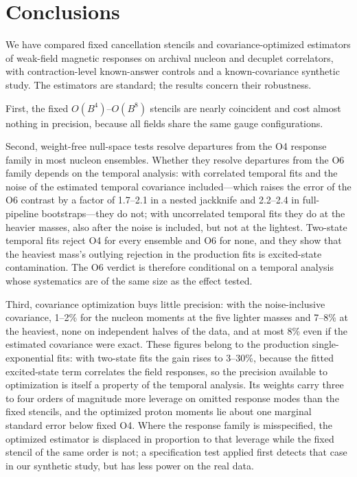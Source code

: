\documentclass[aps,prd,preprint,nofootinbib,floatfix]{revtex4-2}
\begin{document}
\section{Conclusions}

We have compared fixed cancellation stencils and covariance-optimized estimators of weak-field magnetic responses on archival nucleon and decuplet correlators, with contraction-level known-answer controls and a known-covariance synthetic study. The estimators are standard; the results concern their robustness.

First, the fixed $O(B^4)$--$O(B^8)$ stencils are nearly coincident and cost almost nothing in precision, because all fields share the same gauge configurations.

Second, weight-free null-space tests resolve departures from the O4 response family in most nucleon ensembles. Whether they resolve departures from the O6 family depends on the temporal analysis: with correlated temporal fits and the noise of the estimated temporal covariance included---which raises the error of the O6 contrast by a factor of 1.7--2.1 in a nested jackknife and 2.2--2.4 in full-pipeline bootstraps---they do not; with uncorrelated temporal fits they do at the heavier masses, also after the noise is included, but not at the lightest. Two-state temporal fits reject O4 for every ensemble and O6 for none, and they show that the heaviest mass's outlying rejection in the production fits is excited-state contamination. The O6 verdict is therefore conditional on a temporal analysis whose systematics are of the same size as the effect tested.

Third, covariance optimization buys little precision: with the noise-inclusive covariance, 1--2\% for the nucleon moments at the five lighter masses and 7--8\% at the heaviest, none on independent halves of the data, and at most 8\% even if the estimated covariance were exact. These figures belong to the production single-exponential fits: with two-state fits the gain rises to 3--30\%, because the fitted excited-state term correlates the field responses, so the precision available to optimization is itself a property of the temporal analysis. Its weights carry three to four orders of magnitude more leverage on omitted response modes than the fixed stencils, and the optimized proton moments lie about one marginal standard error below fixed O4. Where the response family is misspecified, the optimized estimator is displaced in proportion to that leverage while the fixed stencil of the same order is not; a specification test applied first detects that case in our synthetic study, but has less power on the real data.
\end{document}

